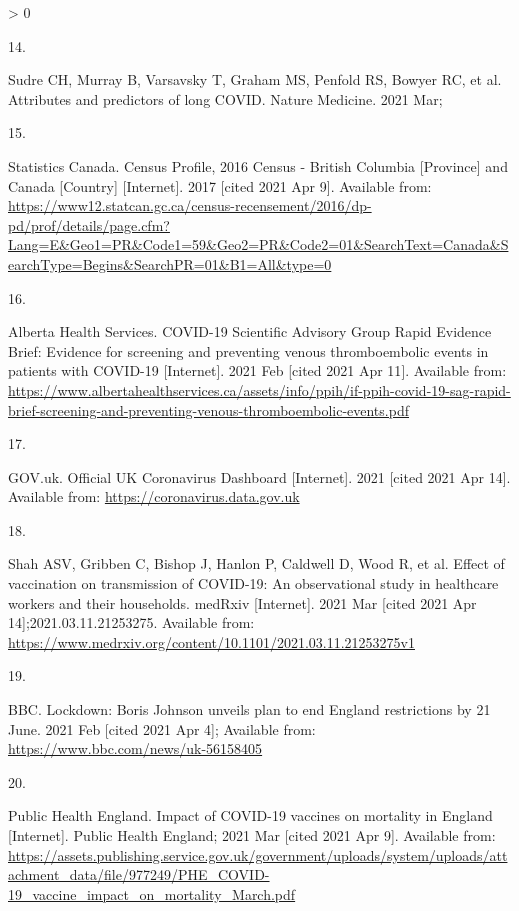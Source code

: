 \documentclass[]{elsarticle} %
\newlength{\csllabelwidth}
\newlength{\cslhangindent}
\newenvironment{CSLReferences}[3] %
 {%
  \setlength{\parindent}{0pt}
  \ifodd #1 \everypar{\setlength{\hangindent}{\cslhangindent}}\ignorespaces\fi
  \ifnum #2 > 0
  \setlength{\parskip}{#2\baselineskip}
  \fi
 }%
 {}
\newcommand{\CSLLeftMargin}[1]{\parbox[t]{\csllabelwidth}{#1}}
\newcommand{\CSLRightInline}[1]{\parbox[t]{\linewidth - \csllabelwidth}{#1}}
\begin{document}
\begin{CSLReferences}{0}{0}
\leavevmode\hypertarget{ref-sudre_attributes_2021}{}%
\CSLLeftMargin{14. }
\CSLRightInline{Sudre CH, Murray B, Varsavsky T, Graham MS, Penfold RS,
Bowyer RC, et al. Attributes and predictors of long {COVID}. Nature
Medicine. 2021 Mar; }

\leavevmode\hypertarget{ref-statistics_canada_census_2017}{}%
\CSLLeftMargin{15. }
\CSLRightInline{Statistics Canada. Census {Profile}, 2016 {Census} -
{British} {Columbia} {[}{Province}{]} and {Canada} {[}{Country}{]}
{[}Internet{]}. 2017 {[}cited 2021 Apr 9{]}. Available from:
\url{https://www12.statcan.gc.ca/census-recensement/2016/dp-pd/prof/details/page.cfm?Lang=E\&Geo1=PR\&Code1=59\&Geo2=PR\&Code2=01\&SearchText=Canada\&SearchType=Begins\&SearchPR=01\&B1=All\&type=0}}

\leavevmode\hypertarget{ref-alberta_health_services_covid-19_2021}{}%
\CSLLeftMargin{16. }
\CSLRightInline{Alberta Health Services. {COVID}-19 {Scientific}
{Advisory} {Group} {Rapid} {Evidence} {Brief}: {Evidence} for screening
and preventing venous thromboembolic events in patients with {COVID}-19
{[}Internet{]}. 2021 Feb {[}cited 2021 Apr 11{]}. Available from:
\url{https://www.albertahealthservices.ca/assets/info/ppih/if-ppih-covid-19-sag-rapid-brief-screening-and-preventing-venous-thromboembolic-events.pdf}}

\leavevmode\hypertarget{ref-govuk_official_2021}{}%
\CSLLeftMargin{17. }
\CSLRightInline{GOV.uk. Official {UK} {Coronavirus} {Dashboard}
{[}Internet{]}. 2021 {[}cited 2021 Apr 14{]}. Available from:
\url{https://coronavirus.data.gov.uk}}

\leavevmode\hypertarget{ref-shah_effect_2021}{}%
\CSLLeftMargin{18. }
\CSLRightInline{Shah ASV, Gribben C, Bishop J, Hanlon P, Caldwell D,
Wood R, et al. Effect of vaccination on transmission of {COVID}-19: An
observational study in healthcare workers and their households. medRxiv
{[}Internet{]}. 2021 Mar {[}cited 2021 Apr 14{]};2021.03.11.21253275.
Available from:
\url{https://www.medrxiv.org/content/10.1101/2021.03.11.21253275v1}}

\leavevmode\hypertarget{ref-bbc_lockdown_2021}{}%
\CSLLeftMargin{19. }
\CSLRightInline{BBC. Lockdown: {Boris} {Johnson} unveils plan to end
{England} restrictions by 21 {June}. 2021 Feb {[}cited 2021 Apr 4{]};
Available from: \url{https://www.bbc.com/news/uk-56158405}}

\leavevmode\hypertarget{ref-public_health_england_impact_2021}{}%
\CSLLeftMargin{20. }
\CSLRightInline{Public Health England. Impact of {COVID}-19 vaccines on
mortality in {England} {[}Internet{]}. Public Health England; 2021 Mar
{[}cited 2021 Apr 9{]}. Available from:
\url{https://assets.publishing.service.gov.uk/government/uploads/system/uploads/attachment_data/file/977249/PHE_COVID-19_vaccine_impact_on_mortality_March.pdf}}


\end{CSLReferences}
\end{document}
